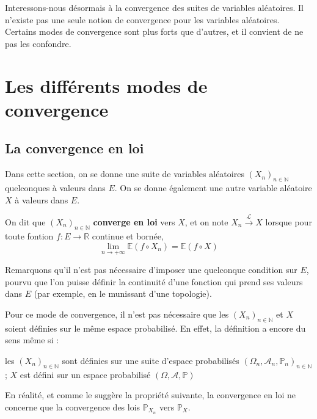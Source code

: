 \documentclass[../integ-proba.tex]{subfiles}
\begin{document}
Interessons-nous désormais à la convergence des suites de variables aléatoires.
Il n'existe pas une seule notion de convergence pour les variables aléatoires.
Certains modes de convergence sont plus forts que d'autres, et il convient de ne pas les confondre.

\section{Les différents modes de convergence}

\subsection{La convergence en loi}

Dans cette section, on se donne une suite de variables aléatoires $\left(X_n\right)_{n\in\mathbb{N}}$ quelconques à valeurs dans $E$.
On se donne également une autre variable aléatoire $X$ à valeurs dans $E$.

\begin{defi}
    On dit que $\left(X_n\right)_{n\in\mathbb{N}}$ \textbf{converge en loi} vers $X$, et on note $X_n \xrightarrow[]{\mathcal{L}} X$ lorsque pour toute fontion $f:E \rightarrow \mathbb{R}$ continue et bornée,
    $$
    \lim_{n \to +\infty} \mathbb{E}\left(f \circ X_n\right) = \mathbb{E}\left(f \circ X\right)
    $$
\end{defi}

\begin{rem}
    Remarquons qu'il n'est pas nécessaire d'imposer une quelconque condition sur $E$, pourvu que l'on puisse définir la continuité d'une fonction qui prend ses valeurs dans $E$ (par exemple, en le munissant d'une topologie).
\end{rem}

\begin{rem}
    Pour ce mode de convergence, il n'est pas nécessaire que les $\left(X_n\right)_{n\in\mathbb{N}}$ et $X$ soient définies sur le même espace probabilisé.
    En effet, la définition a encore du sens même si :
    \begin{itemize}
    \itemb les $\left(X_n\right)_{n\in\mathbb{N}}$ sont définies sur une suite d'espace probabilisés $\left(\Omega_n, \mathcal{A}_n, \mathbb{P}_n\right)_{n \in \mathbb{N}}$ ;
    \itemb $X$ est défini sur un espace probabilisé $\left(\Omega, \mathcal{A}, \mathbb{P}\right)$
    \end{itemize}

    En réalité, et comme le suggère la propriété suivante, la convergence en loi ne concerne que la convergence des lois $\mathbb{P}_{X_n}$ vers $\mathbb{P}_X$.
\end{rem}
\end{document}
